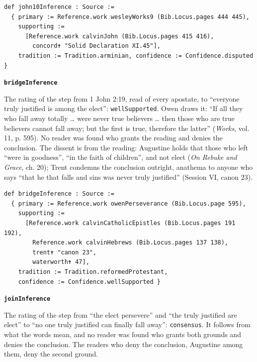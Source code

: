 \documentclass[11pt]{article}
\begin{document}
{\small\begin{verbatim}
def john10Inference : Source :=
  { primary := Reference.work wesleyWorks9 (Bib.Locus.pages 444 445),
    supporting :=
      [Reference.work calvinJohn (Bib.Locus.pages 415 416),
        concord✝ "Solid Declaration XI.45"],
    tradition := Tradition.arminian, confidence := Confidence.disputed }
\end{verbatim}}
\par\medskip\noindent\textbf{\texttt{bridge\allowbreak{}Inference}}\par\nobreak\noindent
The rating of the step from 1 John 2:19, read of every apostate, to “everyone truly justified is among the elect”: \texttt{well\allowbreak{}Supported}. Owen draws it: “If all they who fall away totally … were never true believers … then those who are true believers cannot fall away; but the first is true, therefore the latter” (\emph{Works}, vol. 11, p. 595). No reader was found who grants the reading and denies the conclusion. The dissent is from the reading: Augustine holds that those who left “were in goodness”, “in the faith of children”, and not elect (\emph{On Rebuke and Grace}, ch. 20); Trent condemns the conclusion outright, anathema to anyone who says “that he that falls and sins was never truly justified” (Session VI, canon 23).

{\small\begin{verbatim}
def bridgeInference : Source :=
  { primary := Reference.work owenPerseverance (Bib.Locus.page 595),
    supporting :=
      [Reference.work calvinCatholicEpistles (Bib.Locus.pages 191 192),
        Reference.work calvinHebrews (Bib.Locus.pages 137 138),
        trent✝ "canon 23",
        waterworth✝ 47],
    tradition := Tradition.reformedProtestant,
    confidence := Confidence.wellSupported }
\end{verbatim}}
\par\medskip\noindent\textbf{\texttt{join\allowbreak{}Inference}}\par\nobreak\noindent
The rating of the step from “the elect persevere” and “the truly justified are elect” to “no one truly justified can finally fall away”: \texttt{consensus}. It follows from what the words mean, and no reader was found who grants both grounds and denies the conclusion. The readers who deny the conclusion, Augustine among them, deny the second ground.
\end{document}

